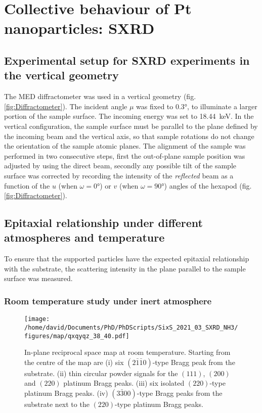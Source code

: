 \section{Collective behaviour of Pt nanoparticles: SXRD}

\subsection{Experimental setup for SXRD experiments in the vertical geometry}\label{sec:SXRDSetupV}

The MED diffractometer was used in a vertical geometry (fig. \ref{fig:Diffractometer}).
The incident angle $\mu$ was fixed to \ang{0.3}, to illuminate a larger portion of the sample surface.
The incoming energy was set to \qty{18.44}{\keV}.
In the vertical configuration, the sample surface must be parallel to the plane defined by the incoming beam and the vertical axis, so that sample rotations do not change the orientation of the sample atomic planes.
The alignment of the sample was performed in two consecutive steps, first the out-of-plane sample position was adjusted by using the direct beam, secondly any possible tilt of the sample surface was corrected by recording the intensity of the \textit{reflected} beam as a function of the $u$ (when $\omega=\ang{0}$) or $v$ (when $\omega=\ang{90}$) angles of the hexapod (fig. \ref{fig:Diffractometer}).

\subsection{Epitaxial relationship under different atmospheres and temperature}

To ensure that the  supported particles have the expected epitaxial relationship with the substrate, the scattering intensity in the plane parallel to the sample surface was measured.

\subsubsection{Room temperature study under inert atmosphere}

\begin{figure}[!htb]
    \centering
    \texttt{[image: /home/david/Documents/PhD/PhDScripts/SixS\_2021\_03\_SXRD\_NH3/figures/map/qxqyqz\_38\_40.pdf]}
    \caption{
        In-plane reciprocal space map at room temperature.
        Starting from the centre of the map are (i) six $(2\bar{1}\bar{1}0)$-type Bragg peak from the substrate.
        (ii) thin circular powder signals for the $(111)$, $(200)$ and $(220)$ platinum Bragg peaks.
        (iii) six isolated $(220)$-type platinum Bragg peaks.
        (iv) $(3\bar{3}00)$-type Bragg peaks from the substrate next to the $(220)$-type platinum Bragg peaks.
    }
    \label{fig:QxQyMap}
\end{figure}

